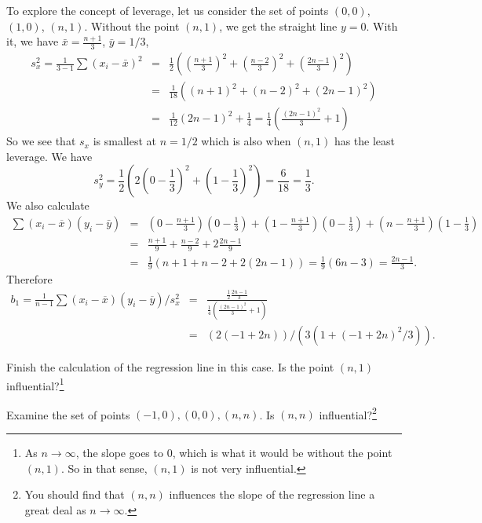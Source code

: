 To explore the concept of leverage, let us consider the set of points $(0,0)$, $(1,0)$, $(n,1)$.
Without the point $(n,1)$, we get the straight line $y=0$.
With it, we have $\bar x=\frac{n+1}3$, $\bar y=1/3$,
\begin{eqnarray*}
	s_x^2 = \frac1{3-1}\sum\left(x_i-\bar x\right)^2 &=& \frac12\left(\left(\frac{n+1}3\right)^2+\left(\frac{n-2}3\right)^2+\left(\frac{2n-1}3\right)^2\right)\\
	&=& \frac1{18}\left(\left(n+1\right)^2+\left(n-2\right)^2+\left(2n-1\right)^2\right)\\
	&=& \frac1{12} \left(2 n - 1\right)^2 + \frac14 = \frac14\left(\frac{\left(2n-1\right)^2}3+1\right)
\end{eqnarray*}
So we see that $s_x$ is smallest at $n=1/2$ which is also when $(n,1)$ has the least leverage.
We have
\[
	s_y^2 = \frac12\left(2\left(0-\frac13\right)^2+\left(1-\frac13\right)^2\right)=\frac6{18}=\frac13.
\]
We also calculate
\begin{eqnarray*}
	\sum \left(x_i-\overline x\right)\left(y_i-\bar y\right) &=& \left(0-\frac{n+1}3\right)\left(0-\frac13\right) + \left(1-\frac{n+1}3\right)\left(0-\frac13\right) + \left(n-\frac{n+1}3\right)\left(1-\frac13\right)\\
	&=& \frac{n+1}9  + \frac{n-2}9  +2\frac{2n-1}9 \\
	&=& \frac19\left(n+1+n-2 +2\left(2n-1\right)\right) = \frac19\left(6n-3\right)=\frac{2n-1}3.
\end{eqnarray*}
Therefore
\begin{eqnarray*}
	b_1=\frac1{n-1}\sum \left(x_i-\overline x\right)\left(y_i-\overline y\right)/s_x^2 &=& \frac{\frac12 \frac{2n-1}3}{\frac14\left(\frac{\left(2n-1\right)^2}3+1\right)}\\
	&=&\left(2 \left(-1 + 2 n\right)\right)/\left(3 \left(1 + \left(-1 + 2 n\right)^2/3\right)\right).
\end{eqnarray*}
\begin{exercise}
Finish the calculation of the regression line in this case. Is the point $(n,1)$ influential?\footnote{As $n\to\infty$, the slope goes to 0, which is what it would be without the point $(n,1)$. So in that sense, $(n,1)$ is not very influential.}
\end{exercise}
\begin{exercise}
Examine the set of points $(-1,0),(0,0),(n,n)$. Is $(n,n)$ influential?\footnote{You should find that $(n,n)$ influences the slope of the regression line a great deal as $n\to\infty$.}
\end{exercise}


